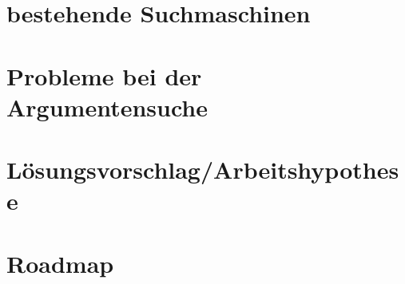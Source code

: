 \documentclass{beamer}
\begin{document}
	\section{bestehende Suchmaschinen}
	\section{Probleme bei der Argumentensuche}
	\section{Lösungsvorschlag/Arbeitshypothese}
	\section{Roadmap}
	\begin{frame}
	\end{frame}
\end{document}
